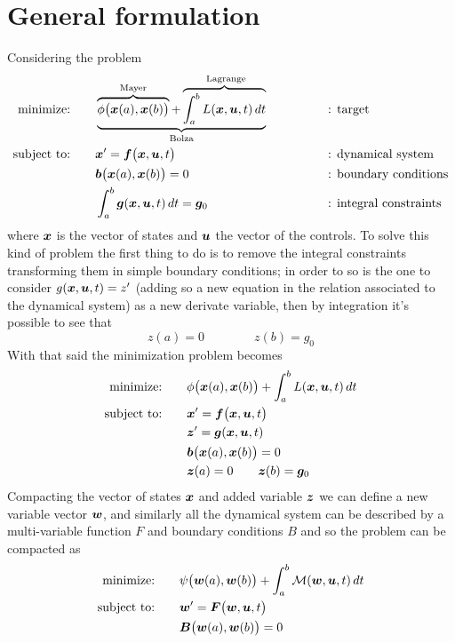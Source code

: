 \section{General formulation}
Considering the problem
\begin{align*}
	\textrm{minimize:} \qquad & \underbrace{ \overbrace{ \phi\big(\boldsymbol{x}(a), \boldsymbol{x}(b)\big)}^\textrm{Mayer} + \overbrace{\int_a^b  L (\boldsymbol{x}, \boldsymbol{u},t)\, dt}^\textrm{ Lagrange}}_\textrm{Bolza} \qquad \qquad && \textrm{: target} \\
	\textrm{subject to:} \qquad & \boldsymbol{x}' = \boldsymbol{f}\big(\boldsymbol{x},\boldsymbol{u},t\big)  && \textrm{: dynamical system} \\
	& \boldsymbol{b}\big(\boldsymbol{x}(a),\boldsymbol{x}(b)\big) = 0 && \textrm{: boundary conditions} \\
	& \int_a^b \boldsymbol{g}(\boldsymbol{x},\boldsymbol{u},  t)\, dt = \boldsymbol{g}_0 && \textrm{: integral constraints}
\end{align*}
where $\boldsymbol{x}$ is the vector of states and $\boldsymbol{u}$ the vector of the controls. To solve this kind of problem the first thing to do is to remove the integral constraints transforming them in simple boundary conditions; in order to so is the one to consider $g(\boldsymbol{x},\boldsymbol{u},t) = z'$  (adding so a new equation in the relation associated to the dynamical system) as a new derivate variable, then by integration it's possible to see that
\[ z(a) = 0 \qquad \qquad z(b) = g_0 \]
With that said the minimization problem becomes
\begin{align*}
	\textrm{minimize:} \qquad & \phi\big(\boldsymbol{x}(a), \boldsymbol{x}(b)\big) + \int_a^b  L (\boldsymbol{x}, \boldsymbol{u},t)\, dt  \\
	\textrm{subject to:} \qquad & \boldsymbol{x}' = \boldsymbol{f}\big(\boldsymbol{x},\boldsymbol{u},t\big)   \\
	& \boldsymbol{z}' = \boldsymbol{g}(\boldsymbol{x}, \boldsymbol{u}, t) \\
	& \boldsymbol{b}\big(\boldsymbol{x}(a),\boldsymbol{x}(b)\big) = 0 \\
	& \boldsymbol{z}(a) = 0 \qquad \boldsymbol{z}(b) = \boldsymbol{g}_0
\end{align*}
Compacting the vector of states $\boldsymbol{x}$ and added variable $\boldsymbol{z}$ we can define a new variable vector $\boldsymbol{w}$, and similarly all the dynamical system can be described by a multi-variable function $F$ and boundary conditions $B$ and so the problem can be compacted as
\begin{align*}
	\textrm{minimize:} \qquad & \psi\big(\boldsymbol{w}(a), \boldsymbol{w}(b)\big) + \int_a^b \mathcal M(\boldsymbol{w}, \boldsymbol{u},t)\, dt  \\
	\textrm{subject to:} \qquad & \boldsymbol{w}' = \boldsymbol{F}\big(\boldsymbol{w},\boldsymbol{u},t\big)   \\
	& \boldsymbol{B}\big(\boldsymbol{w}(a),\boldsymbol{w}(b)\big) = 0 
\end{align*}

